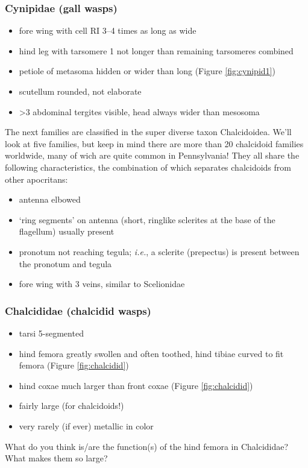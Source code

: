 \documentclass[letterpaper, 11pt]{article}
\begin{document}
\subsubsection{Cynipidae (gall wasps)}
\begin{itemize}
\item fore wing with cell RI 3--4 times as long as wide
\item hind leg with tarsomere 1 not longer than remaining tarsomeres combined
\item petiole of metasoma hidden or wider than long (Figure \ref{fig:cynipid1})
\item scutellum rounded, not elaborate
\item \textgreater{}3 abdominal tergites visible, head always wider than mesosoma
\end{itemize}

\noindent{}The next families are classified in the super diverse taxon Chalcidoidea. We'll look at five families, but keep in mind there are more than 20 chalcidoid families worldwide, many of wich are quite common in Pennsylvania! They all share the following characteristics, the combination of which separates chalcidoids from other apocritans:
\begin{itemize}
\item antenna elbowed
\item `ring segments' on antenna (short, ringlike sclerites at the base of the flagellum) usually present
\item pronotum not reaching tegula; \textit{i.e.}, a sclerite (prepectus) is present between the pronotum and tegula 
\item fore wing with 3 veins, similar to Scelionidae
\end{itemize}

\subsubsection{Chalcididae (chalcidid wasps)}
\begin{itemize}
\item tarsi 5-segmented
\item hind femora greatly swollen and often toothed, hind tibiae curved to fit femora (Figure \ref{fig:chalcidid})
\item hind coxae much larger than front coxae (Figure \ref{fig:chalcidid})
\item fairly large (for chalcidoids!) 
\item very rarely (if ever) metallic in color
\end{itemize}
\noindent{}What do you think is/are the function(s) of the hind femora in Chalcididae? What makes them so large?
\end{document}
